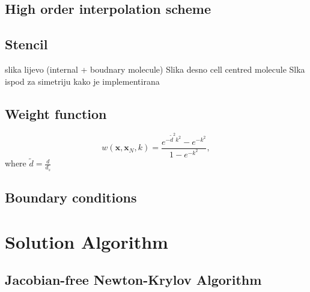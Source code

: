 \documentclass[sn-mathphys,Numbered]{sn-jnl}%
\newcommand{\bb}{\boldsymbol}
\begin{document}
%
\subsection{High order interpolation scheme}
\label{sec:ho_scheme}
%

\subsection{Stencil}
slika lijevo (internal + boudnary molecule)
Slika desno cell centred molecule
Slka ispod za simetriju kako je implementirana


\subsection{Weight function}
\begin{equation}
w(\bb{x}, \bb{x}_N, k) = \frac{e^{-\tilde{d}^2k^2}-e^{-k^2}}{1-e^{-k^2}},
\end{equation}
where $\tilde{d}=\frac{d}{d_s}$
%
\subsection{Boundary conditions}
\label{sec:bc}
%


%
%      
\section{Solution Algorithm}
\label{sec:math_model}
%
%


%
\subsection{Jacobian-free Newton-Krylov Algorithm}
\label{sec:vol_int}
%


%
%        
\end{document}

